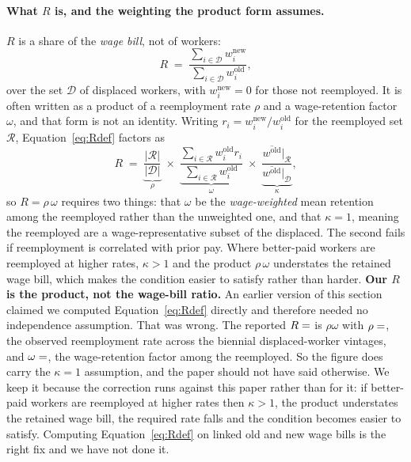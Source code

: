 \paragraph{What $R$ is, and the weighting the product form assumes.} $R$ is a share of the
\emph{wage bill}, not of workers:
\begin{equation}
R \;=\; \frac{\sum_{i \in \mathcal{D}} w_i^{\text{new}}}{\sum_{i \in \mathcal{D}} w_i^{\text{old}}},
\label{eq:Rdef}
\end{equation}
over the set $\mathcal{D}$ of displaced workers, with $w_i^{\text{new}} = 0$ for those not
reemployed. It is often written as a product of a reemployment rate $\rho$ and a wage-retention
factor $\omega$, and that form is not an identity. Writing $r_i = w_i^{\text{new}}/w_i^{\text{old}}$
for the reemployed set $\mathcal{R}$, Equation~\ref{eq:Rdef} factors as
\begin{equation}
R \;=\; \underbrace{\frac{|\mathcal{R}|}{|\mathcal{D}|}}_{\rho}
\;\times\;
\underbrace{\frac{\sum_{i \in \mathcal{R}} w_i^{\text{old}} r_i}{\sum_{i \in \mathcal{R}} w_i^{\text{old}}}}_{\omega}
\;\times\;
\underbrace{\frac{\overline{w^{\text{old}}}\big|_{\mathcal{R}}}{\overline{w^{\text{old}}}\big|_{\mathcal{D}}}}_{\kappa},
\label{eq:Rfactor}
\end{equation}
so $R = \rho\,\omega$ requires two things: that $\omega$ be the \emph{wage-weighted} mean
retention among the reemployed rather than the unweighted one, and that $\kappa = 1$, meaning the
reemployed are a wage-representative subset of the displaced. The second fails if reemployment is
correlated with prior pay. Where better-paid workers are reemployed at higher rates, $\kappa > 1$
and the product $\rho\,\omega$ understates the retained wage bill, which makes the condition
easier to satisfy rather than harder. \textbf{Our $R$ is the product, not the wage-bill ratio.} An earlier version of this
section claimed we computed Equation~\ref{eq:Rdef} directly and therefore needed no
independence assumption. That was wrong. The reported $R = \result{RetainedWageShare}$ is
$\rho\omega$ with $\rho = \result{RhoReemploy}$, the observed reemployment rate across the
biennial displaced-worker vintages, and $\omega = \result{OmegaRetention}$, the wage-retention
factor among the reemployed. So the figure does carry the $\kappa = 1$ assumption, and the
paper should not have said otherwise. We keep it because the correction runs against this
paper rather than for it: if better-paid workers are reemployed at higher rates then
$\kappa > 1$, the product understates the retained wage bill, the required rate falls and the
condition becomes easier to satisfy. Computing Equation~\ref{eq:Rdef} on linked old and new
wage bills is the right fix and we have not done it.

